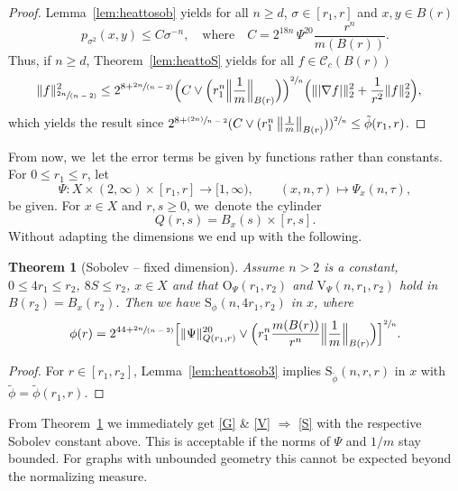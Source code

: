 \documentclass[JEP,XML,SOM,Unicode,published]{cedram}
\newcommand{\psfrac}[2]{\sfrac{(#1)}{#2}}
\newcommand{\spfrac}[2]{\sfrac{#1}{(#2)}}
\newcommand{\rS}{\mathrm{S}}
\newcommand{\rV}{\mathrm{V}}
\newcommand{\rO}{\mathrm{O}}
\theoremstyle{plain}
\newtheorem{theorem}{Theorem}[section]
\theoremstyle{definition}
\newcommand{\cC}{\mathcal{C}}
\begin{document}
\begin{proof}
Lemma~\ref{lem:heattosob} yields for all $n\geq d$, $\sigma\in[r_1,r]$ and $x,y\in B(r)$
\[
p_{\sigma^2}(x,y)
\leq
C
\sigma^{-{n}}, \quad \text{where}\quad C=2^{18n}\,\Psi^{20}\frac{r^{n}}{m(B(r))}.
\]
Thus, if $n\geq d$,
Theorem~\ref{lem:heattoS} yields
for all $f\in\cC_{c}( B(r))$
\begin{align*}
\Vert f\Vert_{\spfrac{2{n}}{{n}-2}}^2
&
\leq 2^{8+\spfrac{2n}{n-2}}\Bigl(C\vee \Bigl(r_1^{n} \Bigl\Vert\frac1m\Bigr\Vert_{B(r)}\Bigr)\Bigr)^{{\sfrac{2}{n}}}\Bigl(
\Vert \vert\nabla f\vert\Vert_2^2+\frac{1}{r^2}\Vert f\Vert_2^2\Bigr),
\end{align*}
which yields the result since $2^{8+\psfrac{2n}{n-2}}(C\vee (r_1^{n} \left\Vert\tfrac1m\right\Vert_{B(r)}))^{{\sfrac{2}{n}}}\leq \tilde\phi(r_{1},{r}) $.
\end{proof}

From now, we~let the error terms be given by functions rather than constants. For $0\leq r_1\leq r$, let
\[
\Psi\colon X\times(2,\infty)\times[r_1,r]\to[1,\infty),\qquad (x,n,\tau)\longmapsto \Psi_{x}(n,\tau),
\]
be given. For $ x\in X $ and $ r,s\ge0 $, we~denote the cylinder
\[
Q(r,s)=B_{x}(s)\times [r,s].
\]
Without adapting the dimensions we end up with the following.

\begin{theorem}[Sobolev -- fixed dimension]\label{thm:heattosobolevgeneral}Assume $ n\!>\!2 $ is a constant,
\hbox{$0\!\leq\! {4} r_1\!\leq\! r_2$}, $8S\leq r_2$, $x\in X$ and that $ \rO_\Psi(r_1,r_2)$ and $\rV_\Psi (n,r_1,r_2)$ hold in $B(r_2)=B_{x}(r_{2})$.
Then we have $\rS_\phi(n, {4}r_1,r_2)$ in $x$, where
\[
\phi(r)=2^{44+\spfrac{2n}{n-2}}\Bigl[{\Vert \Psi\Vert_{Q(r_1,r)}^{20}}\vee \Bigl( r_1^{n}\frac{m(B(r))}{r^{n}}\Bigl\Vert\frac1m\Bigr\Vert_{B(r)}\Bigr) \Bigr]^{\sfrac{2}{n}}.
\]
\end{theorem}

\begin{proof}
For $r\in[r_1,r_2]$, Lemma~\ref{lem:heattosob3} implies $\rS_{\tilde \phi}(n,r,r)$ in $x$ with $ \tilde\phi =\tilde{\phi}(r_{1},r)$.
\end{proof}

From Theorem~\ref{thm:heattosobolevgeneral} we immediately get \eqref{G} \& \eqref{V} $ \Rightarrow $ \eqref{S} with the respective Sobolev constant above. This is acceptable if the norms of $ \Psi $ and $ 1/m $ stay bounded. For graphs with unbounded geometry this cannot be expected beyond the normalizing measure.
\end{document}
